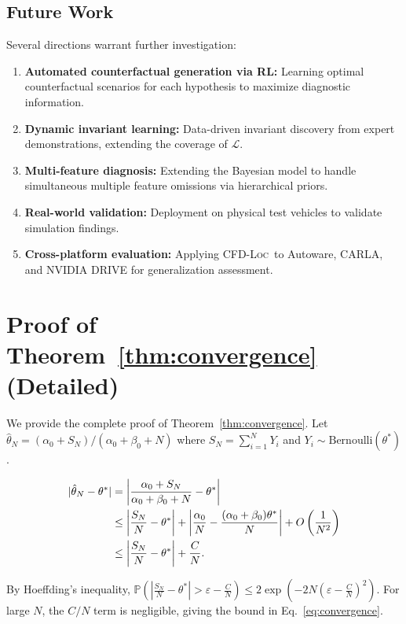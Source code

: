 \documentclass[journal]{IEEEtran}
\theoremstyle{plain}
\theoremstyle{definition}
\theoremstyle{remark}
\newcommand{\methodname}{\textsc{CFD-Loc}}
\newcommand{\invlib}{\mathcal{L}}
\newcommand{\Prob}{\mathbb{P}}
\begin{document}
\subsection{Future Work}

Several directions warrant further investigation:
\begin{enumerate}
    \item \textbf{Automated counterfactual generation via RL:} Learning optimal counterfactual scenarios for each hypothesis to maximize diagnostic information.
    \item \textbf{Dynamic invariant learning:} Data-driven invariant discovery from expert demonstrations, extending the coverage of $\invlib$.
    \item \textbf{Multi-feature diagnosis:} Extending the Bayesian model to handle simultaneous multiple feature omissions via hierarchical priors.
    \item \textbf{Real-world validation:} Deployment on physical test vehicles to validate simulation findings.
    \item \textbf{Cross-platform evaluation:} Applying \methodname\ to Autoware, CARLA, and NVIDIA DRIVE for generalization assessment.
\end{enumerate}

\appendices
\section{Proof of Theorem~\ref{thm:convergence} (Detailed)}
\label{app:proof}

We provide the complete proof of Theorem~\ref{thm:convergence}. Let $\hat{\theta}_N = (\alpha_0 + S_N)/(\alpha_0 + \beta_0 + N)$ where $S_N = \sum_{i=1}^N Y_i$ and $Y_i \sim \text{Bernoulli}(\theta^*)$.

\begin{align}
|\hat{\theta}_N - \theta^*| &= \left|\frac{\alpha_0 + S_N}{\alpha_0 + \beta_0 + N} - \theta^*\right| \notag \\
&\leq \left|\frac{S_N}{N} - \theta^*\right| + \left|\frac{\alpha_0}{N} - \frac{(\alpha_0+\beta_0)\theta^*}{N}\right| + O\left(\frac{1}{N^2}\right) \notag \\
&\leq \left|\frac{S_N}{N} - \theta^*\right| + \frac{C}{N}.
\end{align}

By Hoeffding's inequality, $\Prob(|\frac{S_N}{N} - \theta^*| > \varepsilon - \frac{C}{N}) \leq 2\exp(-2N(\varepsilon - \frac{C}{N})^2)$. For large $N$, the $C/N$ term is negligible, giving the bound in Eq.~\ref{eq:convergence}.
\end{document}
